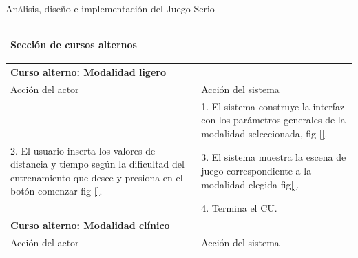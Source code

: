 \begin{thesischapter}{2} {Análisis, diseño e implementación del Juego Serio}
\begin{center}
\begin{table}
\begin{tabularx}{\textwidth}{|X|X|}
                \multicolumn{2}{|X|}{        
                \begin{minipage}[t]{0.925\columnwidth}
                    \begin{center}
                        \textbf{Sección de cursos alternos}
                    \end{center}
                \end{minipage}} \\\hline
                \multicolumn{2}{|X|}{        
                \begin{minipage}[t]{0.925\columnwidth}
                        \textbf{Curso alterno: Modalidad ligero}
                \end{minipage}} \\\hline
                
                Acción del actor & Acción del sistema \\\hline
             
                & 
                1. El sistema construye la interfaz con los parámetros generales de la modalidad seleccionada, fig \ref{}. \\\hline
                2. El usuario inserta los valores de distancia y tiempo según la dificultad del entrenamiento que desee y presiona en el botón comenzar fig \ref{}. 
                & 
                3. El sistema muestra la escena de juego correspondiente a la modalidad elegida fig\ref{}. \\ &4. Termina el CU. \\\hline
                
                \multicolumn{2}{|X|}{        
                \begin{minipage}[t]{0.925\columnwidth}
                        \textbf{Curso alterno: Modalidad clínico}
                \end{minipage}} \\\hline
                
                Acción del actor & Acción del sistema \\\hline
                 

\end{tabularx}
\end{table}
\end{center}
\end{thesischapter}
